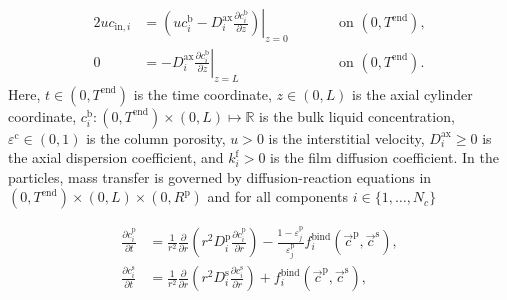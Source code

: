 \documentclass{article}
\begin{document}
\begin{alignat}{2}
u c_{\mathrm{in},i} &= \left.\left( u c^{\mathrm{b}}_i - D^{\mathrm{ax}}_{i} \frac{\partial c^{\mathrm{b}}_i}{\partial z}\right)\right|_{z=0} & &\qquad\text{on }(0, T^{\mathrm{end}}),\\
               0 &= - D^{\mathrm{ax}}_{i} \left. \frac{\partial c^{\mathrm{b}}_i}{\partial z} \right|_{z=L} & &\qquad\text{on }(0, T^{\mathrm{end}}).
\end{alignat}
Here, $t\in (0, T^{\mathrm{end}})$ is the time coordinate, $z\in (0, L)$ is the axial cylinder coordinate, $c^\mathrm{b}_i\colon (0, T^\mathrm{end})\times (0, L) \mapsto \mathbb{R}$ is the bulk liquid concentration, $\varepsilon^\mathrm{c}\in (0, 1)$ is the column porosity, $u> 0$ is the interstitial velocity, $D^\mathrm{ax}_i\geq 0$ is the axial dispersion coefficient, and $k^\mathrm{f}_i> 0$ is the film diffusion coefficient.
In the particles, mass transfer is governed by diffusion-reaction equations in $ (0, T^\mathrm{end}) \times (0, L)\times (0, R^{\mathrm{p}})$ and for all components $i\in\{1, \dots, N_c\}$

\begin{align}
\frac{\partial c^{\mathrm{p}}_{i}}{\partial t} &= \frac{1}{r^2} \frac{\partial }{\partial r} \left( r^2 D_{i}^{\mathrm{p}} \frac{\partial c^{\mathrm{p}}_{i}}{\partial r} \right) - \frac{1 - \varepsilon^{\mathrm{p}}_{j}}{\varepsilon^{\mathrm{p}}_{j}}f^{\mathrm{bind}}_{i}\left( \vec{c}^{\mathrm{p}}, \vec{c}^{\mathrm{s}} \right) , \\
\frac{\partial c^{\mathrm{s}}_{i}}{\partial t} &=  \frac{1}{r^2} \frac{\partial }{\partial r} \left( r^2 D_{i}^{\mathrm{s}} \frac{\partial c^{\mathrm{s}}_{i}}{\partial r} \right)  + f^{\mathrm{bind}}_{i}\left( \vec{c}^{\mathrm{p}}, \vec{c}^{\mathrm{s}} \right) ,
\end{align}
\end{document}
